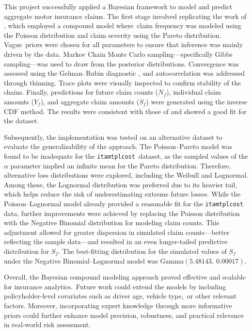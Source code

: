 \documentclass{Class/julia}
\begin{document}
This project successfully applied a Bayesian framework to model and predict aggregate motor insurance claims. The first stage involved replicating the work of \citet{dudley2006bayesian}, which employed a compound model where~claim frequency was modeled using the Poisson distribution and claim severity using the Pareto distribution. Vague~priors were chosen for all parameters to ensure that inference was mainly driven by the data. Markov Chain Monte Carlo sampling—specifically Gibbs sampling—was used to draw from the posterior distributions. Convergence was assessed using the Gelman--Rubin diagnostic \citeyearpar{Gelman1992}, and autocorrelation was addressed through thinning. Trace plots were visually inspected to confirm stability of the chains. Finally, predictions for future claim counts ($N_f$), individual claim amounts ($Y_f$), and aggregate claim amounts ($S_f$) were generated using the inverse CDF method. The results were consistent with those of \citet{dudley2006bayesian} and showed a good fit for the \citet{rytgaard1990pareto} dataset.

Subsequently, the implementation was tested on an alternative dataset to evaluate the generalizability of the \citet{dudley2006bayesian} approach. The Poisson--Pareto model was found to be inadequate for the \texttt{itamtplcost}~dataset, as the sampled values of the $\alpha$ parameter implied an infinite mean for the Pareto distribution. Therefore, alternative loss distributions were explored, including the Weibull and Lognormal. Among these, the Lognormal distribution was preferred due to its heavier tail, which helps reduce the risk of underestimating extreme future losses. While the Poisson--Lognormal model already provided a reasonable fit for the \texttt{itamtplcost} data, further improvements were achieved by replacing the Poisson distribution with the Negative Binomial distribution for modeling claim counts. This adjustment allowed for greater dispersion in simulated claim counts—better reflecting the sample data—and resulted in an even longer-tailed predictive distribution for $S_f$. The best-fitting distribution for the simulated values of $S_f$ under the Negative Binomial--Lognormal model was $\mathrm{Gamma}(5.48143,\ 0.00017)$.

Overall, the Bayesian compound modeling approach proved effective and scalable for insurance analytics.~Future work could extend the models by including policyholder-level covariates such as driver age, vehicle type,~or other relevant factors. Moreover, incorporating expert knowledge through more informative priors could further enhance model precision, robustness, and practical relevance in real-world risk assessment.

\end{document}
